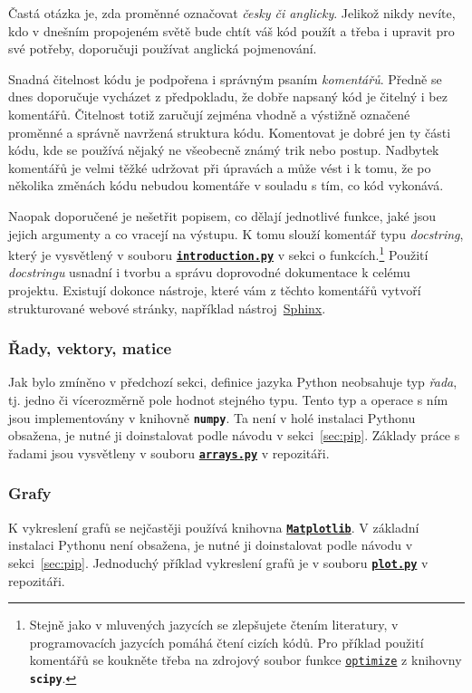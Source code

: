 \documentclass[a4paper,11pt,twoside]{article}
\def\code#1{\textnormal{\texttt{#1}}}
\def\file#1{\textnormal{\textbf{\texttt{#1}}}}
\def\ghfile#1#2{\textnormal{\textbf{\texttt{\href{https://github.com/PavelStransky/PCInPhysics/blob/main/#1#2}{#2}}}}}
\theoremstyle{red}
\theoremstyle{green}
\begin{document}
    Častá otázka je, zda proměnné označovat \emph{česky či anglicky}.
    Jelikož nikdy nevíte, kdo v dnešním propojeném světě bude chtít váš kód použít a třeba i upravit pro své potřeby, doporučuji používat anglická pojmenování.
    
    Snadná čitelnost kódu je podpořena i správným psaním \emph{komentářů}.
    Předně se dnes doporučuje vycházet z předpokladu, že dobře napsaný kód je čitelný i bez komentářů.
    Čitelnost totiž zaručují zejména vhodně a výstižně označené proměnné a správně navržená struktura kódu.
    Komentovat je dobré jen ty části kódu, kde se používá nějaký ne všeobecně známý trik nebo postup.
    Nadbytek komentářů je velmi těžké udržovat při úpravách a může vést i k tomu, že po několika změnách kódu nebudou komentáře v souladu s tím, co kód vykonává.
    
    Naopak doporučené je nešetřit popisem, co dělají jednotlivé funkce, jaké jsou jejich argumenty a co vracejí na výstupu.
    K tomu slouží komentář typu \emph{docstring}, který je vysvětlený v souboru \ghfile{python/basics/}{introduction.py} v sekci o funkcích.\footnote{
        Stejně jako v mluvených jazycích se zlepšujete čtením literatury, v programovacích jazycích pomáhá čtení cizích kódů.
        Pro příklad použití komentářů se koukněte třeba na zdrojový soubor funkce \code{\href{https://github.com/scipy/scipy/blob/master/scipy/optimize/optimize.py}{optimize}} z knihovny \file{scipy}.
    }
    Použití \emph{docstringu} usnadní i tvorbu a správu doprovodné dokumentace k celému projektu.
    Existují dokonce nástroje, které vám z těchto komentářů vytvoří strukturované webové stránky, například nástroj~\href{https://www.sphinx-doc.org}{Sphinx}.

\subsubsection{Řady, vektory, matice}
\label{sec:numpy}
    Jak bylo zmíněno v předchozí sekci, definice jazyka Python neobsahuje typ \emph{řada}, tj. jedno či vícerozměrně pole hodnot stejného typu.
    Tento typ a operace s ním jsou implementovány v knihovně \file{numpy}.
    Ta není v holé instalaci Pythonu obsažena, je nutné ji doinstalovat podle návodu v sekci~\ref{sec:pip}.
    Základy práce s řadami jsou vysvětleny v souboru \ghfile{python/basics/}{arrays.py} v repozitáři.

\subsubsection{Grafy}
    K vykreslení grafů se nejčastěji používá knihovna \file{\href{https://matplotlib.org}{Matplotlib}}.
    V základní instalaci Pythonu není obsažena, je nutné ji doinstalovat podle návodu v sekci~\ref{sec:pip}.
    Jednoduchý příklad vykreslení grafů je v souboru \ghfile{python/basics/}{plot.py} v repozitáři.
\end{document}
